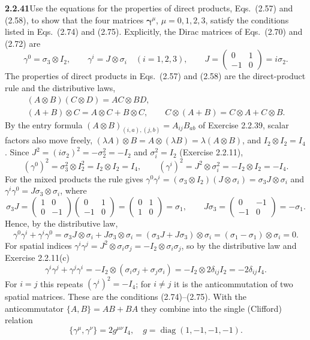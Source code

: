 \par\bigskip
\noindent\textbf{2.2.41}\quad Use the equations for the properties of direct
products, Eqs.~(2.57) and (2.58), to show that the four matrices
$\boldsymbol{\gamma}^{\mu}$, $\mu=0,1,2,3$, satisfy the conditions listed in
Eqs.~(2.74) and (2.75).
\solution
Explicitly, the Dirac matrices of Eqs.~(2.70) and (2.72) are
\[
\gamma^0=\sigma_3\otimes I_2,\qquad
\gamma^i=J\otimes\sigma_i\quad(i=1,2,3),\qquad
J=\begin{pmatrix}0&1\\-1&0\end{pmatrix}=i\sigma_2.
\]
The properties of direct products in Eqs.~(2.57) and (2.58) are the
direct-product rule and the distributive laws,
\[
\begin{gathered}
(A\otimes B)(C\otimes D)=AC\otimes BD,\\
(A+B)\otimes C=A\otimes C+B\otimes C,\qquad
C\otimes(A+B)=C\otimes A+C\otimes B.
\end{gathered}
\]
By the entry formula $(A\otimes B)_{(i,a),(j,b)}=A_{ij}B_{ab}$ of
Exercise 2.2.39, scalar factors also move freely,
$(\lambda A)\otimes B=A\otimes(\lambda B)=\lambda(A\otimes B)$, and
$I_2\otimes I_2=I_4$.
Since $J^2=(i\sigma_2)^2=-\sigma_2^2=-I_2$ and $\sigma_i^2=I_2$
(Exercise 2.2.11),
\[
(\gamma^0)^2=\sigma_3^2\otimes I_2^2=I_2\otimes I_2=I_4,\qquad
(\gamma^i)^2=J^2\otimes\sigma_i^2=-I_2\otimes I_2=-I_4.
\]
For the mixed products the rule gives
$\gamma^0\gamma^i=(\sigma_3\otimes I_2)(J\otimes\sigma_i)
=\sigma_3J\otimes\sigma_i$ and
$\gamma^i\gamma^0=J\sigma_3\otimes\sigma_i$, where
\[
\sigma_3J=\begin{pmatrix}1&0\\0&-1\end{pmatrix}
\begin{pmatrix}0&1\\-1&0\end{pmatrix}
=\begin{pmatrix}0&1\\1&0\end{pmatrix}=\sigma_1,\qquad
J\sigma_3=\begin{pmatrix}0&-1\\-1&0\end{pmatrix}=-\sigma_1.
\]
Hence, by the distributive law,
\[
\gamma^0\gamma^i+\gamma^i\gamma^0
=\sigma_3J\otimes\sigma_i+J\sigma_3\otimes\sigma_i
=(\sigma_3J+J\sigma_3)\otimes\sigma_i=(\sigma_1-\sigma_1)\otimes\sigma_i=0.
\]
For spatial indices $\gamma^i\gamma^j=J^2\otimes\sigma_i\sigma_j
=-I_2\otimes\sigma_i\sigma_j$, so by the distributive law and
Exercise 2.2.11(c)
\[
\gamma^i\gamma^j+\gamma^j\gamma^i
=-I_2\otimes(\sigma_i\sigma_j+\sigma_j\sigma_i)
=-I_2\otimes2\delta_{ij}I_2=-2\delta_{ij}I_4.
\]
For $i=j$ this repeats $(\gamma^i)^2=-I_4$; for $i\ne j$ it is the
anticommutation of two spatial matrices.
These are the conditions (2.74)--(2.75). With the anticommutator
$\{A,B\}=AB+BA$ they combine into the single (Clifford) relation
\[
\boxed{\{\gamma^\mu,\gamma^\nu\}=2g^{\mu\nu}I_4,\quad
g=\operatorname{diag}(1,-1,-1,-1)}.
\]

